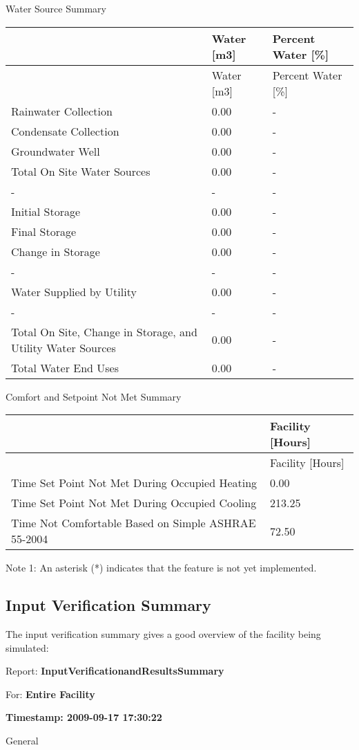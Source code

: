 Water Source Summary

\begin{longtable}[c]{p{3.0in}p{1.5in}p{1.5in}}
\toprule 
~ & Water [m3] & Percent Water [\%] \tabularnewline
\midrule
\endfirsthead

\toprule 
~ & Water [m3] & Percent Water [\%] \tabularnewline
\midrule
\endhead

Rainwater Collection & 0.00 & - \tabularnewline
Condensate Collection & 0.00 & - \tabularnewline
Groundwater Well & 0.00 & - \tabularnewline
Total On Site Water Sources & 0.00 & - \tabularnewline
- & - & - \tabularnewline
Initial Storage & 0.00 & - \tabularnewline
Final Storage & 0.00 & - \tabularnewline
Change in Storage & 0.00 & - \tabularnewline
- & - & - \tabularnewline
Water Supplied by Utility & 0.00 & - \tabularnewline
- & - & - \tabularnewline
Total On Site, Change in Storage, and Utility Water Sources & 0.00 & - \tabularnewline
Total Water End Uses & 0.00 & - \tabularnewline
\bottomrule
\end{longtable}

Comfort and Setpoint Not Met Summary

\begin{longtable}[c]{p{4.5in}p{1.5in}}
\toprule 
~ & Facility [Hours] \tabularnewline
\midrule
\endfirsthead

\toprule 
~ & Facility [Hours] \tabularnewline
\midrule
\endhead

Time Set Point Not Met During Occupied Heating & 0.00 \tabularnewline
Time Set Point Not Met During Occupied Cooling & 213.25 \tabularnewline
Time Not Comfortable Based on Simple ASHRAE 55-2004 & 72.50 \tabularnewline
\bottomrule
\end{longtable}

Note 1: An asterisk (*) indicates that the feature is not yet implemented.

\subsection{Input Verification Summary}\label{input-verification-summary}

The input verification summary gives a good overview of the facility being simulated:

Report: \textbf{InputVerificationandResultsSummary}

For: \textbf{Entire Facility}

\textbf{Timestamp: 2009-09-17 17:30:22}

General

